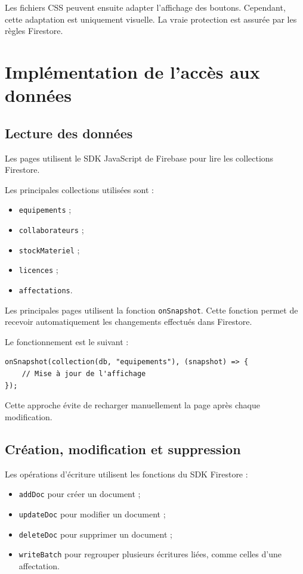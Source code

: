 \documentclass{rapportENSIAS}
\begin{document}
Les fichiers CSS peuvent ensuite adapter l’affichage des boutons. Cependant, cette adaptation est uniquement visuelle. La vraie protection est assurée par les règles Firestore.

\section{Implémentation de l’accès aux données}

\subsection{Lecture des données}

Les pages utilisent le SDK JavaScript de Firebase pour lire les collections Firestore.

Les principales collections utilisées sont :

\begin{itemize}
    \item \texttt{equipements} ;
    \item \texttt{collaborateurs} ;
    \item \texttt{stockMateriel} ;
    \item \texttt{licences} ;
    \item \texttt{affectations}.
\end{itemize}

Les principales pages utilisent la fonction \texttt{onSnapshot}. Cette fonction permet de recevoir automatiquement les changements effectués dans Firestore.

Le fonctionnement est le suivant :

\begin{verbatim}
onSnapshot(collection(db, "equipements"), (snapshot) => {
    // Mise à jour de l'affichage
});
\end{verbatim}

Cette approche évite de recharger manuellement la page après chaque modification.

\subsection{Création, modification et suppression}

Les opérations d’écriture utilisent les fonctions du SDK Firestore :

\begin{itemize}
    \item \texttt{addDoc} pour créer un document ;
    \item \texttt{updateDoc} pour modifier un document ;
    \item \texttt{deleteDoc} pour supprimer un document ;
    \item \texttt{writeBatch} pour regrouper plusieurs écritures liées, comme celles d’une affectation.
\end{itemize}
\end{document}
